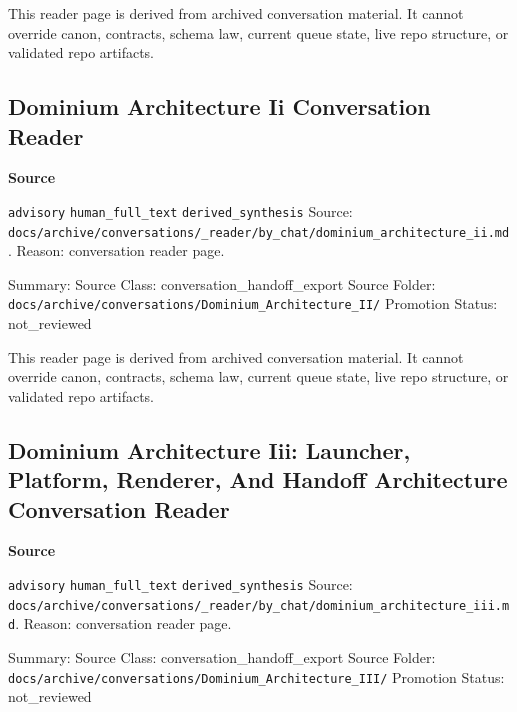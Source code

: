 \documentclass[9pt,a4paper,openany]{book}
\newcommand{\vonecallout}[3]{\par\medskip\noindent\begingroup\setlength{\fboxsep}{7pt}\colorbox{DomCalloutBg}{\parbox{0.94\linewidth}{\textbf{\textcolor{#1}{#2}}\par #3}}\endgroup\par\medskip}
\begin{document}
This reader page is derived from archived conversation material.\allowbreak{} It cannot override canon, contracts, schema law, current queue state, live repo structure, or validated repo artifacts.\allowbreak{}



\subsection{Dominium Architecture Ii Conversation Reader}

\vonecallout{DomSlate}{Source}{\texttt{advisory} \texttt{human\_\allowbreak{}full\_\allowbreak{}text} \texttt{derived\_\allowbreak{}synthesis} Source: \texttt{docs/\allowbreak{}archive/\allowbreak{}conversations/\allowbreak{}\_\allowbreak{}reader/\allowbreak{}by\_\allowbreak{}chat/\allowbreak{}dominium\_\allowbreak{}architecture\_\allowbreak{}ii.\allowbreak{}md}.\allowbreak{} Reason: conversation reader page.\allowbreak{}}

Summary: Source Class: conversation\_\allowbreak{}handoff\_\allowbreak{}export Source Folder: \texttt{docs/\allowbreak{}archive/\allowbreak{}conversations/\allowbreak{}Dominium\_\allowbreak{}Architecture\_\allowbreak{}II/\allowbreak{}} Promotion Status: not\_\allowbreak{}reviewed


This reader page is derived from archived conversation material.\allowbreak{} It cannot override canon, contracts, schema law, current queue state, live repo structure, or validated repo artifacts.\allowbreak{}



\subsection{Dominium Architecture Iii: Launcher, Platform, Renderer, And Handoff Architecture Conversation Reader}

\vonecallout{DomSlate}{Source}{\texttt{advisory} \texttt{human\_\allowbreak{}full\_\allowbreak{}text} \texttt{derived\_\allowbreak{}synthesis} Source: \texttt{docs/\allowbreak{}archive/\allowbreak{}conversations/\allowbreak{}\_\allowbreak{}reader/\allowbreak{}by\_\allowbreak{}chat/\allowbreak{}dominium\_\allowbreak{}architecture\_\allowbreak{}iii.\allowbreak{}md}.\allowbreak{} Reason: conversation reader page.\allowbreak{}}

Summary: Source Class: conversation\_\allowbreak{}handoff\_\allowbreak{}export Source Folder: \texttt{docs/\allowbreak{}archive/\allowbreak{}conversations/\allowbreak{}Dominium\_\allowbreak{}Architecture\_\allowbreak{}III/\allowbreak{}} Promotion Status: not\_\allowbreak{}reviewed
\end{document}
